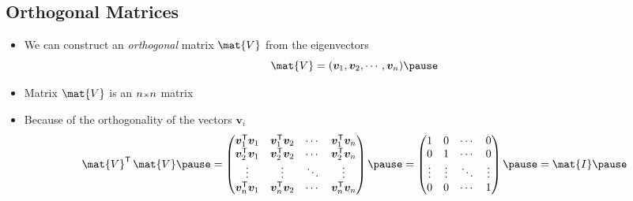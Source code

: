 \documentclass[25pt,landscape,footrule]{foils}
\begin{document}
\begin{slide}
\section[-2]{Orthogonal Matrices}

\begin{PauseHighLight}
  \begin{itemize}
  \item We can construct an \emph{orthogonal} matrix $\mat{V}$ from the
    eigenvectors
    \begin{displaymath}
      \mat{V} = (\bm{v}_1, \bm{v}_2 , \cdots, \bm{v}_n)\pause
    \end{displaymath}
    \vspace*{-1cm}
  \item Matrix $\mat{V}$ is an $n{\scriptstyle \times} n$ matrix\pause
  \item Because of the orthogonality of the vectors $\bm{v}_i$
    \begin{displaymath}
      \mat{V}^\tr \, \mat{V} \pause =
      \begin{pmatrix}
        \bm{v}^\tr_1 \bm{v}_1 & \bm{v}^\tr_1 \bm{v}_2 & \cdots &
        \bm{v}^\tr_1 \bm{v}_n
        \\
        \bm{v}^\tr_2 \bm{v}_1 & \bm{v}^\tr_2 \bm{v}_2 & \cdots &
        \bm{v}^\tr_2 \bm{v}_n
        \\
        \vdots & \vdots & \ddots & \vdots
        \\
        \bm{v}^\tr_n \bm{v}_1 & \bm{v}^\tr_n \bm{v}_2 & \cdots &
        \bm{v}^\tr_n \bm{v}_n
      \end{pmatrix} \pause =
      \begin{pmatrix}
        1 & 0 & \cdots & 0 \\
        0 & 1 & \cdots & 0 \\
        \vdots & \vdots & \ddots & \vdots \\
        0 & 0 & \cdots & 1
      \end{pmatrix} \pause
      = \mat{I}\pause
    \end{displaymath}
  \end{itemize}
\end{PauseHighLight}

\end{slide}

\end{document}
